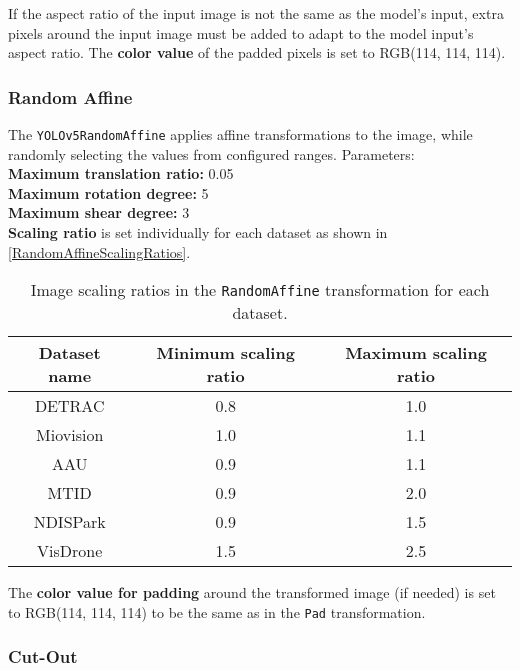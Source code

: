 If the aspect ratio of the input image is not the same as the model's input, extra pixels around the input image must be added
to adapt to the model input's aspect ratio. The \textbf{color value} of the padded pixels is set to RGB(114, 114, 114).


\subsubsection*{Random Affine}

The \texttt{YOLOv5RandomAffine} applies affine transformations to the image,
while randomly selecting the values from configured ranges. Parameters:\\
\textbf{Maximum translation ratio:} 0.05 \\
\textbf{Maximum rotation degree:} 5 \\
\textbf{Maximum shear degree:} 3 \\
\textbf{Scaling ratio} is set individually for each dataset as shown in \autoref{RandomAffineScalingRatios}.

\begin{table}[h]
    \centering
    \begin{threeparttable}
        \begin{tabular}{|c|c|c|}
            \hline
            Dataset name & Minimum scaling ratio & Maximum scaling ratio \\
            \hline
            DETRAC       & 0.8 & 1.0 \\
            Miovision    & 1.0 & 1.1 \\
            AAU          & 0.9 & 1.1 \\
            MTID         & 0.9 & 2.0 \\
            NDISPark     & 0.9 & 1.5 \\
            VisDrone     & 1.5 & 2.5 \\
            \hline
        \end{tabular}
        \caption{Image scaling ratios in the \texttt{RandomAffine} transformation for each dataset.}
        \label{RandomAffineScalingRatios}
    \end{threeparttable}
\end{table}

The \textbf{color value for padding} around the transformed image (if needed)
is set to RGB(114, 114, 114) to be the same as in the \texttt{Pad} transformation.


\subsubsection*{Cut-Out}

